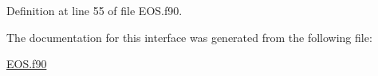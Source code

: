 Definition at line 55 of file E\+O\+S.\+f90.



The documentation for this interface was generated from the following file\+:\begin{DoxyCompactItemize}
\item 
\hyperlink{EOS_8f90}{E\+O\+S.\+f90}\end{DoxyCompactItemize}
